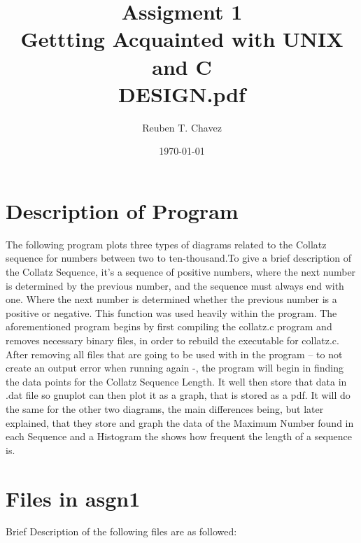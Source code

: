 \documentclass[11pt]{article} %
\title{Assigment 1 \\
    \large Gettting Acquainted with UNIX and C \\
    \textbf{ DESIGN.pdf}}
\author{Reuben T. Chavez}
\date{\today} %
\begin{document}
\maketitle %

\pagebreak
\section{Description of Program}
\begin{flushleft}The following program plots three types of diagrams related to the Collatz sequence for numbers between two to ten-thousand.To give a brief description of the Collatz Sequence, it’s a sequence of positive numbers, where the next number is determined by the previous number, and the sequence must always end with one. Where the next number is determined whether the previous number is a positive or negative. This function was used heavily within the program. The aforementioned program begins by first compiling the collatz.c program and removes necessary binary files, in order to rebuild the executable for collatz.c. After removing all files that are going to be used with in the program – to not create an output error when running again -, the program will begin in finding the data points for the Collatz Sequence Length. It well then store that data in .dat file so gnuplot can then plot it as a graph, that is stored as a pdf. It will do the same for the other two diagrams, the main differences being, but later explained, that they store and graph the data of the Maximum Number found in each Sequence and a Histogram the shows how frequent the length of a sequence is.
\end{flushleft}
\pagebreak
\section{Files in asgn1} 

Brief Description of the following files are as followed:
\end{document}
